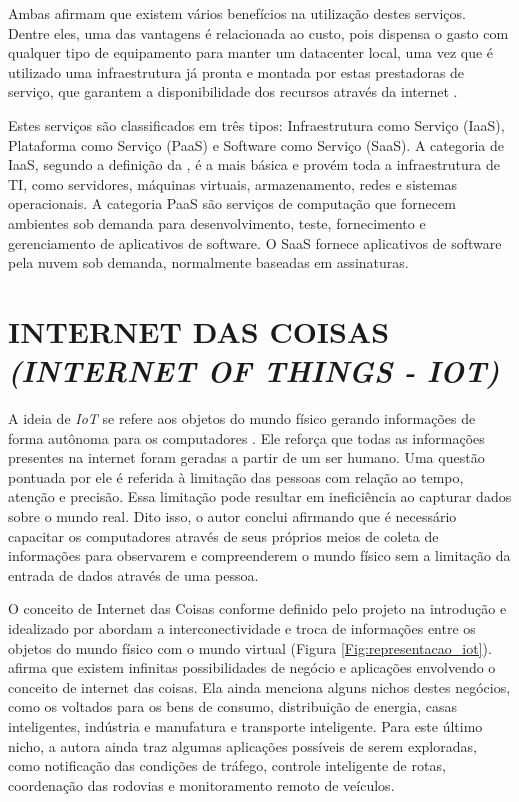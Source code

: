 Ambas afirmam que existem vários benefícios na utilização destes serviços. Dentre eles, uma das vantagens é relacionada ao custo, pois dispensa o gasto com qualquer tipo de equipamento para manter um datacenter local, uma vez que é utilizado uma infraestrutura já pronta e montada por estas prestadoras de serviço, que garantem a disponibilidade dos recursos através da internet \cite{amazoncloudcomputing, microsoft}.

Estes serviços são classificados em três tipos: Infraestrutura como Serviço (IaaS), Plataforma como Serviço (PaaS) e Software como Serviço (SaaS). A categoria de IaaS, segundo a definição da , é a mais básica e provém toda a infraestrutura de TI, como servidores, máquinas virtuais, armazenamento, redes e sistemas operacionais. A categoria PaaS são serviços de computação que fornecem ambientes sob demanda para desenvolvimento, teste, fornecimento e gerenciamento de aplicativos de software. O SaaS fornece aplicativos de software pela nuvem sob demanda, normalmente baseadas em assinaturas.

\section{INTERNET DAS COISAS \textit{(INTERNET OF THINGS - IOT)}}
A ideia de \textit{IoT} se refere aos objetos do mundo físico gerando informações de forma autônoma para os computadores \cite{ashton}. Ele reforça que todas as informações presentes na internet foram geradas a partir de um ser humano. Uma questão pontuada por ele é referida à limitação das pessoas com relação ao tempo, atenção e precisão. Essa limitação pode resultar em ineficiência ao capturar dados sobre o mundo real. Dito isso, o autor conclui afirmando que é necessário capacitar os computadores através de seus próprios meios de coleta de informações para observarem e compreenderem o mundo físico sem a limitação da entrada de dados através de uma pessoa.

O conceito de Internet das Coisas conforme definido pelo projeto  na introdução e idealizado por  abordam a interconectividade e troca de informações entre os objetos do mundo físico com o mundo virtual (Figura \ref{Fig:representacao_iot}).  afirma que existem infinitas possibilidades de negócio e aplicações envolvendo o conceito de internet das coisas. Ela ainda menciona alguns nichos destes negócios, como os voltados para os bens de consumo, distribuição de energia, casas inteligentes, indústria e manufatura e transporte inteligente. Para este último nicho, a autora ainda traz algumas aplicações possíveis de serem exploradas, como notificação das condições de tráfego, controle inteligente de rotas, coordenação das rodovias e monitoramento remoto de veículos.

